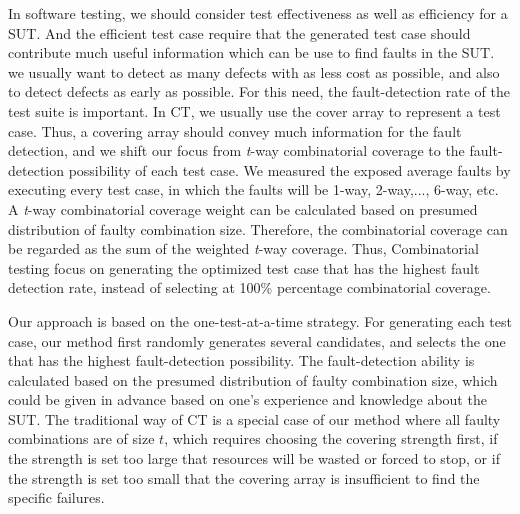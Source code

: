 \documentclass[10pt,conference, compsocconf]{IEEEtran}
\begin{document}
\begin{CJK}{UTF8}{gkai}
In software testing,
we should consider test effectiveness as well as efficiency for a SUT. 
And the efficient test case require that the generated test case 
should contribute much useful information which can be use to 
find faults in the SUT.
we usually want to detect as many defects with as
less cost as possible, and also to detect defects as early as possible.
For this need, the fault-detection rate of the test suite is important. 
In CT, we usually use the cover array to represent a test case.
Thus, a covering array should convey much information for the fault detection, 
and we shift our focus from \emph{t}-way combinatorial coverage 
to the fault-detection possibility of each test case.
We measured the exposed average faults by executing every test case,
in which the faults will be 1-way, 2-way,..., 6-way, etc. 
A \emph{t}-way combinatorial coverage weight can be calculated based on 
presumed distribution of faulty combination size.
Therefore, the combinatorial coverage can be regarded as the sum of the 
weighted \emph{t}-way coverage.
Thus, Combinatorial testing focus on generating the optimized 
test case that has the highest fault detection rate, 
instead of selecting at 100\% percentage combinatorial coverage.

Our approach is based on the one-test-at-a-time strategy.
For generating each test case, our method first randomly generates several
candidates, and selects the one that has the highest fault-detection
possibility. The fault-detection ability is calculated based on the
presumed distribution of faulty combination size, 
which could be given in advance based on one's experience and knowledge about the SUT. 
The traditional way of CT is
a special case of our method where all faulty combinations are of size $t$,
which requires choosing the covering strength first,
if the strength is set too large that resources will be wasted or forced 
to stop, or if the strength is set too small that the covering array  
is insufficient to find the specific failures\cite{Nie2013QSC}.  


\end{CJK}
\end{document}
